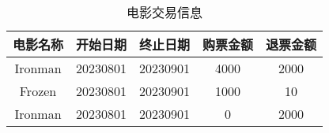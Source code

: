 \documentclass[UTF8]{ctexart}
\newcommand{\kaiti}{\CJKfamily{kaiti}}
\begin{document}
\begin{center}
    \begin{table}
        \renewcommand\arraystretch{2}
        \small
        \resizebox{\textwidth}{!}
        {
            \begin{tabular}{|c|c|c|c|c|}
                \hline
                \kaiti 电影名称 & \kaiti 开始日期 & \kaiti 终止日期 & \kaiti 购票金额 & \kaiti 退票金额 \\

\hline
\kaiti Ironman&\kaiti 20230801&\kaiti 20230901&\kaiti 4000&\kaiti 2000\\
\hline
\kaiti Frozen&\kaiti 20230801&\kaiti 20230901&\kaiti 1000&\kaiti 10\\
\hline
\kaiti Ironman&\kaiti 20230801&\kaiti 20230901&\kaiti 0&\kaiti 2000\\
                \hline
            \end{tabular}
        }

        \caption*{电影交易信息}
    \end{table}
\end{center}
\end{document}
